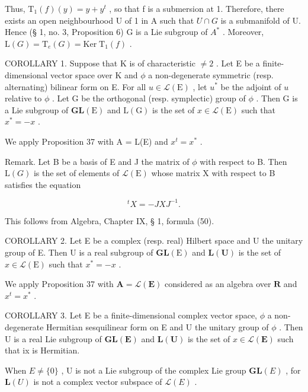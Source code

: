 Thus, \(\mathrm{T}_{1}(f)(y)=y+y^{t}\) , so that f is a submersion at 1. Therefore, there exists an open neighbourhood U of 1 in A such that \(U\cap G\) is a submanifold of U. Hence (§ 1, no. 3, Proposition 6) G is a Lie subgroup of \(A^{*}\) . Moreover, \(\mathrm{L}(G)=\mathrm{T}_{e}(G)=\mathrm{Ker}\;\mathrm{T}_{1}(f)\) .

COROLLARY 1. Suppose that K is of characteristic \(\neq 2\) . Let E be a finite-dimensional vector space over K and \(\phi\) a non-degenerate symmetric (resp. alternating) bilinear form on E. For all \(u \in \mathcal{L}(\mathrm{E})\) , let \(u^*\) be the adjoint of \(u\) relative to \(\phi\) . Let G be the orthogonal (resp. symplectic) group of \(\phi\) . Then G is a Lie subgroup of \(\mathbf{GL}(\mathrm{E})\) and \(\mathrm{L}(\mathrm{G})\) is the set of \(x \in \mathcal{L}(\mathrm{E})\) such that \(x^* = -x\) .

We apply Proposition 37 with A = L(E) and \(x^{t} = x^{*}\) .

Remark. Let B be a basis of E and J the matrix of \(\phi\) with respect to B. Then \(\mathrm{L}(G)\) is the set of elements of \(\mathcal{L}(\mathrm{E})\) whose matrix X with respect to B satisfies the equation

\[
{ } ^ { t } X = - J X J ^ { - 1 } .
\]

This follows from Algebra, Chapter IX, § 1, formula (50).

COROLLARY 2. Let E be a complex (resp. real) Hilbert space and U the unitary group of E. Then U is a real subgroup of \(\mathbf{GL}(\mathrm{E})\) and \(\mathbf{L}(\mathbf{U})\) is the set of \(x \in \mathcal{L}(\mathrm{E})\) such that \(x^{*} = -x\) .

We apply Proposition 37 with \(\mathbf{A} = \mathcal{L}(\mathbf{E})\) considered as an algebra over \(\mathbf{R}\) and \(x^t = x^*\) .

COROLLARY 3. Let E be a finite-dimensional complex vector space, \(\phi\) a non-degenerate Hermitian sesquilinear form on E and U the unitary group of \(\phi\) . Then U is a real Lie subgroup of \(\mathbf{GL}(\mathbf{E})\) and \(\mathbf{L}(\mathbf{U})\) is the set of \(x \in \mathcal{L}(\mathbf{E})\) such that ix is Hermitian.

When \(E \neq \{0\}\) , U is not a Lie subgroup of the complex Lie group \(\mathbf{GL}(E)\) , for \(\mathbf{L}(U)\) is not a complex vector subspace of \(\mathcal{L}(E)\) .

